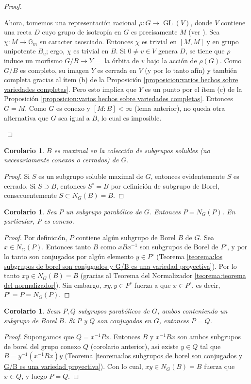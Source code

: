 \documentclass[spanish,10pt]{amsart}
\newtheorem{corollary}[theorem]{Corolario}
\theoremstyle{definition}
\theoremstyle{remark}
\numberwithin{equation}{section}
\begin{document}
\begin{proof}
\begin{enumerate}
Ahora, tomemos una representación racional $\rho : G \rightarrow \operatorname{GL}(V)$, donde $V$ contiene una recta $D$ cuyo grupo de isotropía en $G$ es precisamente $M$ (ver \cite[Teorema 11.2]{humphreys2012linearAlgebraicGroups}). Sea $\chi : M \to \mathbb{G}_m$ su caracter asosciado. Entonces $\chi$ es trivial en $[M,M]$ y en grupo unipotente $B_u$; ergo, $\chi$ es trivial en $B$. Si $0 \neq v \in V$ genera $D$, se tiene que $\rho$ induce un morfismo $G/B \to Y =$ la órbita de $v$ bajo la acción de $\rho (G)$. Como $G/B$ es completo, su imagen $Y$ es cerrada en $V$ (y por lo tanto afín) y también completa gracias al ítem (b) de la Proposición \ref{proposicion:varios hechos sobre variedades completas}. Pero esto implica que $Y$ es un punto por el ítem (c) de la Proposición \ref{proposicion:varios hechos sobre variedades completas}. Entonces $G = M$. Como $G$ es conexo y $[M : B] < \infty$ (lema anterior), no queda otra alternativa que $G$ sea igual a $B$, lo cual es imposible.
\end{enumerate}
\end{proof}

\begin{corollary}
$B$ es maximal en la colección de subgrupos solubles (no necesariamente conexos o cerrados) de $G$.
\end{corollary}
\begin{proof}
Si $S$ es un subgrupo soluble maximal de $G$, entonces evidentemente $S$ es cerrado. Si $S \supset B$, entonces $S^\circ = B$ por definición de subgrupo de Borel, consecuentemente $S \subset N_G (B) = B$.
\end{proof}

\begin{corollary}
Sea $P$ un subgrupo parabólico de $G$. Entonces $P = N_G (P)$. En particular, $P$ es conexo.
\end{corollary}
\begin{proof}
Por definición, $P$ contiene algún subgrupo de Borel $B$ de $G$. Sea $x \in N_G (P)$. Entonces tanto $B$ como $x B x^{-1}$ son subgrupos de Borel de $P^\circ$, y por lo tanto son conjugados por algún elemento $y \in P^\circ$ (Teorema \ref{teorema:los subgrupos de borel son conjugados y G/B es una variedad proyectiva}). Por lo tanto $xy \in N_G (B) = B$ (gracias al Teorema del Normalizador \ref{teorema:teorema del normalizador}). Sin embargo, $xy, y \in P^\circ$ fuerza a que $x \in P^\circ$, es decir, $P^\circ = P = N_G (P)$.
\end{proof}

\begin{corollary}
Sean $P,Q$ subgrupos parabólicos de $G$, ambos conteniendo un subgrupo de Borel $B$. Si $P$ y $Q$ son conjugados en $G$, entonces $P = Q$.
\end{corollary}
\begin{proof}
Supongamos que $Q = x^{-1} P x$. Entonces $B$ y $x^{-1}B x$ son ambos subgrupos de borel del grupo conexo $Q$ (corolario anterior), así existe $y \in Q$ tal que $B = y^{-1} (x ^{-1} B x) y$ (Teorema \ref{teorema:los subgrupos de borel son conjugados y G/B es una variedad proyectiva}). Con lo cual, $xy \in N_G (B) = B$ fuerza que $x \in Q$, y luego $P = Q$.
\end{proof}
\end{document}

